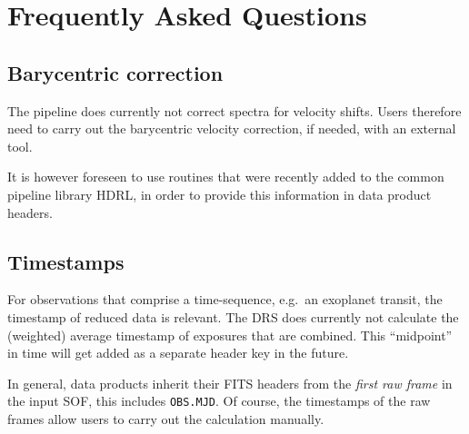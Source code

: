 \section{Frequently Asked Questions}

\subsection{Barycentric correction}
The pipeline does currently not correct spectra for velocity shifts. Users therefore need to carry out the barycentric velocity correction, if needed, with an external tool.

It is however foreseen to use routines that were recently added to the
common pipeline library HDRL, in order to provide this information in 
data product headers.

\subsection{Timestamps}
For observations that comprise a time-sequence, e.g.~an exoplanet transit,
the timestamp of reduced data is relevant. The DRS does currently not 
calculate the (weighted) average timestamp of exposures that are combined. This ``midpoint'' in time will get added as a separate header key in the future.

In general, data products inherit their FITS headers from the \emph{first raw frame} in the input SOF, this includes \texttt{OBS.MJD}. Of course, the timestamps of the raw frames allow users to carry out the calculation manually.